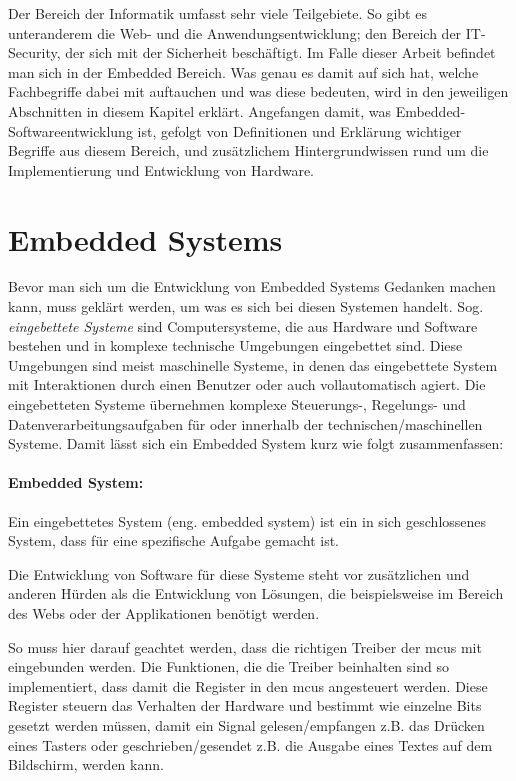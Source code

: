 
Der Bereich der Informatik umfasst  sehr viele Teilgebiete.
So gibt es unteranderem die Web- und die Anwendungsentwicklung; den Bereich der IT-Security, der sich mit der Sicherheit beschäftigt.
Im Falle dieser Arbeit befindet man sich in der Embedded Bereich.
Was genau es damit auf sich hat, welche Fachbegriffe dabei mit auftauchen und was diese bedeuten, wird in den jeweiligen Abschnitten in diesem Kapitel erklärt.
Angefangen damit, was Embedded-Softwareentwicklung ist,
gefolgt von Definitionen und Erklärung wichtiger Begriffe aus diesem Bereich,
und zusätzlichem Hintergrundwissen rund um die Implementierung und Entwicklung von Hardware.

\section{Embedded Systems}
Bevor man sich um die Entwicklung von Embedded Systems Gedanken machen kann, muss geklärt werden, um was es sich bei diesen Systemen handelt.
Sog. \emph{eingebettete Systeme} sind Computersysteme, die aus Hardware und Software bestehen und in komplexe technische Umgebungen eingebettet sind.
Diese Umgebungen sind meist maschinelle Systeme, in denen das eingebettete System mit Interaktionen durch einen Benutzer oder auch vollautomatisch agiert.
Die eingebetteten Systeme übernehmen komplexe Steuerungs-, Regelungs- und Datenverarbeitungsaufgaben für oder innerhalb der technischen/maschinellen Systeme.
Damit lässt sich ein Embedded System kurz wie folgt zusammenfassen:

\paragraph{Embedded System:}
Ein eingebettetes System (eng. embedded system) ist ein in sich geschlossenes System, dass für eine spezifische Aufgabe gemacht ist.

\vspace{6 mm}

Die Entwicklung von Software für diese Systeme steht vor zusätzlichen und anderen Hürden als die Entwicklung von Lösungen, die beispielsweise im Bereich des Webs oder der Applikationen benötigt werden.

So muss hier darauf geachtet werden, dass die richtigen Treiber der \gls{mcu}s mit eingebunden werden. 
Die Funktionen, die die Treiber beinhalten sind so implementiert, dass damit die Register in den \gls{mcu}s angesteuert werden.
Diese Register steuern das Verhalten der Hardware und bestimmt wie einzelne Bits gesetzt werden müssen, damit ein Signal gelesen/empfangen z.B. das Drücken eines Tasters oder geschrieben/gesendet z.B. die Ausgabe eines Textes auf dem Bildschirm, werden kann.



